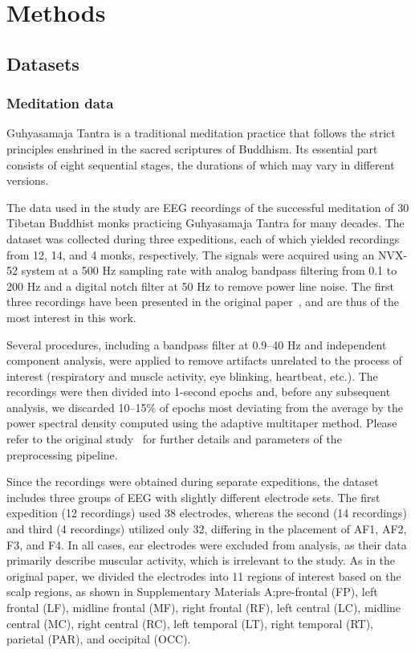 \documentclass[pdflatex,sn-basic,Numbered]{sn-jnl}
\begin{document}
\section{Methods}

\subsection{Datasets}

\subsubsection{Meditation data}

Guhyasamaja Tantra is a traditional meditation practice that follows the strict principles enshrined in the sacred scriptures of Buddhism. Its essential part consists of eight sequential stages, the durations of which may vary in different versions.

The data used in the study are EEG recordings of the successful meditation of 30 Tibetan Buddhist monks practicing Guhyasamaja Tantra for many decades. The dataset was collected during three expeditions, each of which yielded recordings from 12, 14, and 4 monks, respectively. The signals were acquired using an NVX-52 system at a 500 Hz sampling rate with analog bandpass filtering from 0.1 to 200 Hz and a digital notch filter at 50 Hz to remove power line noise. The first three recordings have been presented in the original paper~\cite{SDA}, and are thus of the most interest in this work. 

Several procedures, including a bandpass filter at 0.9--40 Hz and independent component analysis, were applied to remove artifacts unrelated to the process of interest (respiratory and muscle activity, eye blinking, heartbeat, etc.). The recordings were then divided into 1-second epochs and, before any subsequent analysis, we discarded 10--15\% of epochs most deviating from the average by the power spectral density computed using the adaptive multitaper method. Please refer to the original study~\cite{SDA} for further details and parameters of the preprocessing pipeline.

Since the recordings were obtained during separate expeditions, the dataset includes three groups of EEG with slightly different electrode sets. The first expedition (12 recordings) used 38 electrodes, whereas the second (14 recordings) and third (4 recordings) utilized only 32, differing in the placement of AF1, AF2, F3, and F4. In all cases, ear electrodes were excluded from analysis, as their data primarily describe muscular activity, which is irrelevant to the study. As in the original paper, we divided the electrodes into 11 regions of interest based on the scalp regions, as shown in Supplementary Materials A:\@ pre-frontal (FP), left frontal (LF), midline frontal (MF), right frontal (RF), left central (LC), midline central (MC), right central (RC), left temporal (LT), right temporal (RT), parietal (PAR), and occipital (OCC).
\end{document}
